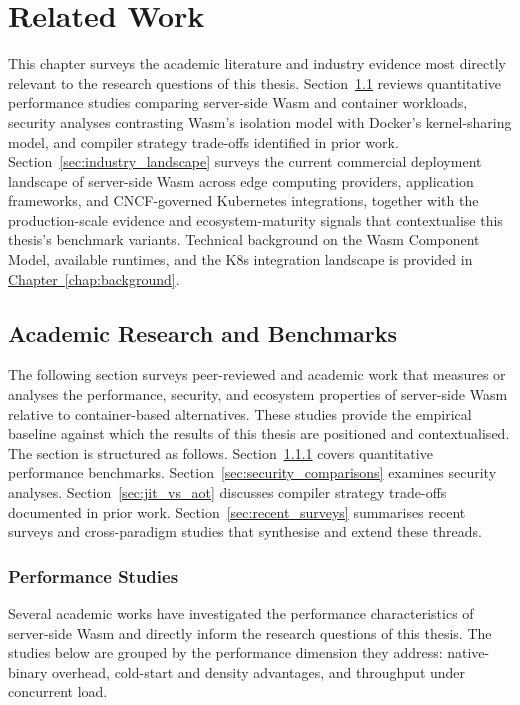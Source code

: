 \chapter{Related Work}
\label{chap:state_of_the_art}

This chapter surveys the academic literature and industry evidence most directly relevant to the research questions of this thesis. Section~\ref{sec:academic_research} reviews quantitative performance studies comparing server-side \acs{Wasm} and container workloads, security analyses contrasting \acs{Wasm}'s isolation model with Docker's kernel-sharing model, and compiler strategy trade-offs identified in prior work. Section~\ref{sec:industry_landscape} surveys the current commercial deployment landscape of server-side \acs{Wasm} across edge computing providers, application frameworks, and \acs{CNCF}-governed Kubernetes integrations, together with the production-scale evidence and ecosystem-maturity signals that contextualise this thesis's benchmark variants. Technical background on the \acs{Wasm} Component Model, available runtimes, and the \acs{K8s} integration landscape is provided in \hyperref[chap:background]{Chapter~\ref{chap:background}}.

\section{Academic Research and Benchmarks}
\label{sec:academic_research}

The following section surveys peer-reviewed and academic work that measures or analyses the performance, security, and ecosystem properties of server-side \acs{Wasm} relative to container-based alternatives. These studies provide the empirical baseline against which the results of this thesis are positioned and contextualised. The section is structured as follows. Section~\ref{sec:performance_studies} covers quantitative performance benchmarks. Section~\ref{sec:security_comparisons} examines security analyses. Section~\ref{sec:jit_vs_aot} discusses compiler strategy trade-offs documented in prior work. Section~\ref{sec:recent_surveys} summarises recent surveys and cross-paradigm studies that synthesise and extend these threads.

\subsection{Performance Studies}
\label{sec:performance_studies}

Several academic works have investigated the performance characteristics of server-side \acs{Wasm} and directly inform the research questions of this thesis. The studies below are grouped by the performance dimension they address: native-binary overhead, cold-start and density advantages, and throughput under concurrent load.

